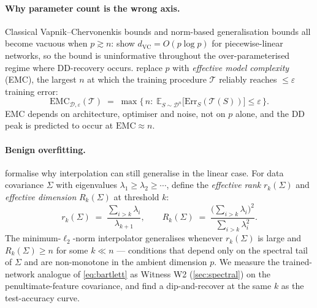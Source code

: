 \documentclass{article}
\begin{document}
\paragraph{Why parameter count is the wrong axis.} Classical Vapnik--Chervonenkis bounds and norm-based generalisation bounds \citep{bartlett2017spectrally,neyshabur2018pac} all become vacuous when $p\gtrsim n$: \citet{bartlett2019nearly} show $d_{\mathrm{VC}}=O(p\log p)$ for piecewise-linear networks, so the bound is uninformative throughout the over-parameterised regime where DD-recovery occurs. \citet{nakkiran2021deep} replace $p$ with \emph{effective model complexity} (EMC), the largest $n$ at which the training procedure $\mathcal{T}$ reliably reaches $\le\varepsilon$ training error:
\begin{equation}
  \label{eq:emc}
  \mathrm{EMC}_{\mathcal{D},\varepsilon}(\mathcal{T}) \;=\; \max\!\Big\{\,n:\; \mathbb{E}_{S\sim\mathcal{D}^n}\!\big[\mathrm{Err}_S(\mathcal{T}(S))\big] \le \varepsilon \,\Big\}.
\end{equation}
EMC depends on architecture, optimiser and noise, not on $p$ alone, and the DD peak is predicted to occur at $\mathrm{EMC}\approx n$.

\paragraph{Benign overfitting.} \citet{bartlett2020benign} formalise why interpolation can still generalise in the linear case. For data covariance $\Sigma$ with eigenvalues $\lambda_1 \ge \lambda_2 \ge \cdots$, define the \emph{effective rank} $r_k(\Sigma)$ and \emph{effective dimension} $R_k(\Sigma)$ at threshold $k$:
\begin{equation}
  \label{eq:bartlett}
  r_k(\Sigma) \;=\; \frac{\sum_{i>k}\lambda_i}{\lambda_{k+1}}, \qquad
  R_k(\Sigma) \;=\; \frac{\big(\sum_{i>k}\lambda_i\big)^{2}}{\sum_{i>k}\lambda_i^{2}}.
\end{equation}
The minimum-$\ell_2$-norm interpolator generalises whenever $r_k(\Sigma)$ is large and $R_k(\Sigma) \ge n$ for some $k \ll n$ --- conditions that depend only on the spectral tail of $\Sigma$ and are non-monotone in the ambient dimension $p$. We measure the trained-network analogue of \cref{eq:bartlett} as Witness W2 (\cref{sec:spectral}) on the penultimate-feature covariance, and find a dip-and-recover at the same $k$ as the test-accuracy curve.
\end{document}
